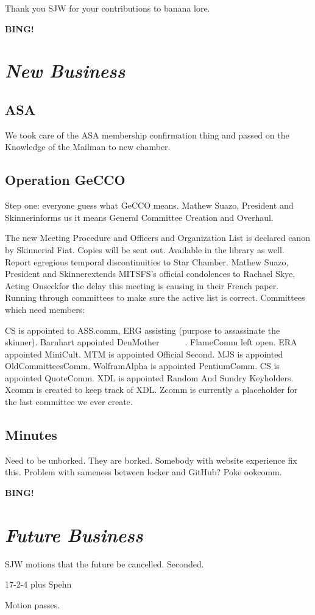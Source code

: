 \documentclass[10pt]{article}
\newcommand{\bing}{{\bf BING!} }
\newcommand{\goto}[1]{\bing \vskip 12pt \section*{{\em{#1}}}}
\newcommand{\ps}{ plus Spehn\xspace}
\newcommand{\skinner}{Mathew Suazo, President and Skinner}
\newcommand{\onseck}{Rachael Skye, Acting Onseck}
\begin{document}
Thank you SJW for your contributions to banana lore.

\goto{New Business}

\subsection{ASA}
We took care of the ASA membership confirmation thing and passed on the Knowledge of the Mailman to new chamber.

\subsection{Operation GeCCO}
Step one: everyone guess what GeCCO means. \skinner informs us it means General Committee Creation and Overhaul.
\vspace{12pt}

The new Meeting Procedure and Officers and Organization List is declared canon by Skinnerial Fiat. Copies will be sent out. Available in the library as well. Report egregious temporal discontinuities to Star Chamber.
\vspace{12pt}
\skinner extends MITSFS's official condolences to \onseck for the delay this meeting is causing in their French paper.
\vspace{12pt}
Running through committees to make sure the active list is correct. Committees which need members:

\vspace{12pt}
CS is appointed to ASS.comm, ERG assisting (purpose to assassinate the skinner). Barnhart appointed DenMother~~~~~~. FlameComm left open. ERA appointed MiniCult. MTM is appointed Official Second. MJS is appointed OldCommitteesComm. WolframAlpha is appointed PentiumComm. CS is appointed QuoteComm. XDL is appointed Random And Sundry Keyholders.  Xcomm is created to keep track of XDL. Zcomm is currently a placeholder for the last committee we ever create.

\subsection{Minutes}
Need to be unborked. They are borked. Somebody with website experience fix this. Problem with sameness between locker and GitHub? Poke ookcomm.

\goto{Future Business}

SJW motions that the future be cancelled.
Seconded.

17-2-4 \ps

Motion passes.
\end{document}
